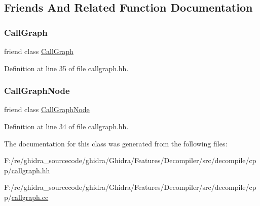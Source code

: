 \subsection{Friends And Related Function Documentation}
\mbox{\label{class_call_graph_edge_a05afb094c2637ded1f1b905b70d198a9}} 
\subsubsection{\texorpdfstring{CallGraph}{CallGraph}}
{\footnotesize\ttfamily friend class \mbox{\hyperlink{class_call_graph}{Call\+Graph}}\hspace{0.3cm}{\ttfamily [friend]}}



Definition at line 35 of file callgraph.\+hh.

\mbox{\label{class_call_graph_edge_ad87c9cd7af608d084b270c20d3e291c7}} 
\subsubsection{\texorpdfstring{CallGraphNode}{CallGraphNode}}
{\footnotesize\ttfamily friend class \mbox{\hyperlink{class_call_graph_node}{Call\+Graph\+Node}}\hspace{0.3cm}{\ttfamily [friend]}}



Definition at line 34 of file callgraph.\+hh.



The documentation for this class was generated from the following files\+:\begin{DoxyCompactItemize}
\item 
F\+:/re/ghidra\+\_\+sourcecode/ghidra/\+Ghidra/\+Features/\+Decompiler/src/decompile/cpp/\mbox{\hyperlink{callgraph_8hh}{callgraph.\+hh}}\item 
F\+:/re/ghidra\+\_\+sourcecode/ghidra/\+Ghidra/\+Features/\+Decompiler/src/decompile/cpp/\mbox{\hyperlink{callgraph_8cc}{callgraph.\+cc}}\end{DoxyCompactItemize}
